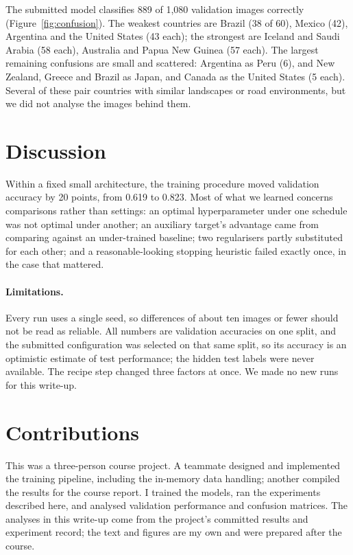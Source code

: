 \documentclass[11pt,a4paper]{article}
\begin{document}
The submitted model classifies 889 of 1,080 validation images correctly (Figure~\ref{fig:confusion}). The weakest countries are Brazil (38 of 60), Mexico (42), Argentina and the United States (43 each); the strongest are Iceland and Saudi Arabia (58 each), Australia and Papua New Guinea (57 each). The largest remaining confusions are small and scattered: Argentina as Peru (6), and New Zealand, Greece and Brazil as Japan, and Canada as the United States (5 each). Several of these pair countries with similar landscapes or road environments, but we did not analyse the images behind them.

\section{Discussion}
Within a fixed small architecture, the training procedure moved validation accuracy by 20 points, from 0.619 to 0.823. Most of what we learned concerns comparisons rather than settings: an optimal hyperparameter under one schedule was not optimal under another; an auxiliary target's advantage came from comparing against an under-trained baseline; two regularisers partly substituted for each other; and a reasonable-looking stopping heuristic failed exactly once, in the case that mattered.

\paragraph{Limitations.} Every run uses a single seed, so differences of about ten images or fewer should not be read as reliable. All numbers are validation accuracies on one split, and the submitted configuration was selected on that same split, so its accuracy is an optimistic estimate of test performance; the hidden test labels were never available. The recipe step changed three factors at once. We made no new runs for this write-up.

\section*{Contributions}
This was a three-person course project. A teammate designed and implemented the training pipeline, including the in-memory data handling; another compiled the results for the course report. I trained the models, ran the experiments described here, and analysed validation performance and confusion matrices. The analyses in this write-up come from the project's committed results and experiment record; the text and figures are my own and were prepared after the course.
\end{document}
